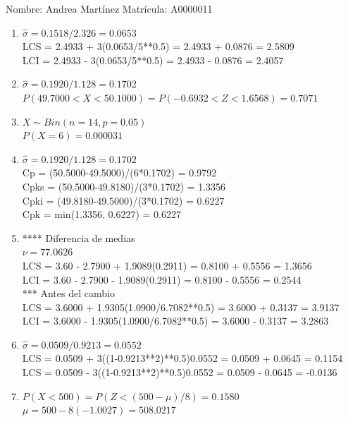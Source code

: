\documentclass[8pt]{report}
\begin{document}
 \newpage

Nombre: \underline{\hspace*{.2in}}
Andrea Martínez
\underline{\hspace*{.2in}} \quad Matr\'icula:\underline{\hspace*{.2in}}
A0000011
\underline{\hspace*{.2in}} \\

\begin{enumerate}
\item $\hat\sigma = 0.1518/2.326 = 0.0653$\\
LCS = 2.4933 + 3(0.0653/5**0.5) = 2.4933 + 0.0876 = 2.5809\\
LCI = 2.4933 - 3(0.0653/5**0.5) = 2.4933 - 0.0876 = 2.4057
\item $\hat\sigma = 0.1920/1.128 = 0.1702$\\
$P(49.7000 < X < 50.1000) = P(-0.6932 < Z < 1.6568) = 0.7071$\\
\item $X \sim Bin(n=14, p=0.05)$\\
$P(X = 6) = 0.000031$
\item $\hat\sigma = 0.1920/1.128 = 0.1702$\\
Cp = (50.5000-49.5000)/(6*0.1702) = 0.9792\\
Cpks = (50.5000-49.8180)/(3*0.1702) = 1.3356\\
Cpki = (49.8180-49.5000)/(3*0.1702) = 0.6227\\
Cpk = min(1.3356, 0.6227) = 0.6227
\item **** Diferencia de medias\\
$\nu = 77.0626$\\
LCS = 3.60 - 2.7900 + 1.9089(0.2911) = 0.8100 + 0.5556 = 1.3656\\
LCI = 3.60 - 2.7900 - 1.9089(0.2911) = 0.8100 - 0.5556 = 0.2544\\
*** Antes del cambio\\
LCS = 3.6000 + 1.9305(1.0900/6.7082**0.5) = 3.6000 + 0.3137 = 3.9137\\
LCI = 3.6000 - 1.9305(1.0900/6.7082**0.5) = 3.6000 - 0.3137 = 3.2863\\
\item $\hat\sigma = 0.0509/0.9213 = 0.0552$\\
LCS = 0.0509 + 3((1-0.9213**2)**0.5)0.0552 = 0.0509 + 0.0645 = 0.1154\\
LCS = 0.0509 - 3((1-0.9213**2)**0.5)0.0552 = 0.0509 - 0.0645 = -0.0136
\item $P(X < 500) = P(Z < (500-\mu)/8) = 0.1580$\\
$\mu = 500 - 8(-1.0027) = 508.0217$\\
\end{enumerate}
\end{document}
